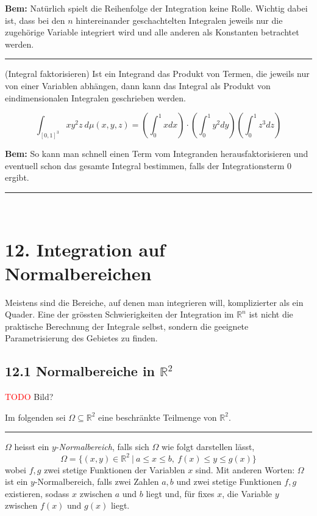\documentclass[a4paper,landscape,8pt]{extarticle}
\newcommand{\R}{\mathbb{R}}
\newcommand{\setsep}{\ \vert \ }
\newcommand{\todo}{\textcolor{red}{TODO }}
\newcommand{\sep}{\vspace{5pt}\noindent\hrule\vspace{5pt}}
\newcommand{\Bem}{\textbf{Bem: }}
\renewcommand*{\newpage}{ \ }
\begin{document}
\begin{multicols*}{4}
\Bem Natürlich spielt die Reihenfolge der Integration keine Rolle. Wichtig dabei
ist, dass bei den $n$ hintereinander geschachtelten Integralen jeweils nur die
zugehörige Variable integriert wird und alle anderen als Konstanten betrachtet
werden.

\sep

\Trick (Integral faktorisieren) Ist ein Integrand das Produkt von Termen, die
jeweils nur von einer Variablen abhängen, dann kann das Integral als Produkt von
eindimensionalen Integralen geschrieben werden.

\Bsp
\[
\int_{[0,1]^3}xy^2z \ d\mu(x,y,z) = \left(\int_0^1x dx\right) \cdot
\left(\int_0^1y^2 dy\right) \left(\int_0^1z^3 dz\right)
\]

\Bem So kann man schnell einen Term vom Integranden herausfaktorisieren und
eventuell schon das gesamte Integral bestimmen, falls der Integrationsterm 0
ergibt.

\sep

\newpage

\section{12. Integration auf Normalbereichen}

Meistens sind die Bereiche, auf denen man integrieren will, komplizierter als
ein Quader. Eine der grössten Schwierigkeiten der Integration im $\R^n$ ist
nicht die praktische Berechnung der Integrale selbst, sondern die geeignete
Parametrisierung des Gebietes zu finden.

\subsection{12.1 Normalbereiche in $\R^2$}

\begin{warmup}
\todo Bild?
\end{warmup}

Im folgenden sei $\Omega\subseteq\R^2$ eine beschränkte Teilmenge von $\R^2$.

\sep

\Def $\Omega$ heisst ein $y$-\emph{Normalbereich}, falls sich $\Omega$ wie folgt
darstellen lässt,
\[
\Omega = \{(x,y)\in\R^2 \setsep a\leq x\leq b, \ f(x)\leq y \leq g(x)\}
\]
wobei $f,g$ zwei stetige Funktionen der Variablen $x$ sind. Mit anderen Worten:
$\Omega$ ist ein $y$-Normalbereich, falls zwei Zahlen $a,b$ und zwei stetige
Funktionen $f,g$ existieren, sodass $x$ zwischen $a$ und $b$ liegt und, für 
fixes $x$, die Variable $y$ zwischen $f(x)$ und $g(x)$ liegt.


\end{multicols*}
\end{document}
